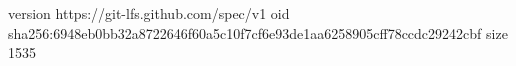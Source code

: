 version https://git-lfs.github.com/spec/v1
oid sha256:6948eb0bb32a8722646f60a5c10f7cf6e93de1aa6258905cff78ccdc29242cbf
size 1535
